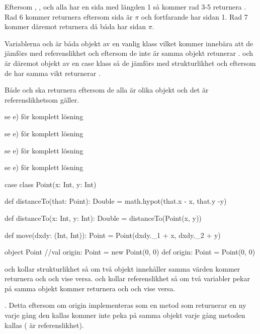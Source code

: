Eftersom , ,  och  alla har en sida med längden 1 så kommer rad 3-5 returnera . Rad 6 kommer returnera  eftersom  sida är $\pi$ och  fortfarande har sidan 1. Rad 7 kommer däremot returnera  då båda har sidan $\pi$.

\Task %

\Subtask Variablerna  och  är båda objekt av en vanlig klass vilket kommer innebära att de jämförs med referenslikhet och eftersom de inte är samma objekt retunerar \code{==} .  och  är däremot objekt av en case klass så de jämförs med strukturlikhet och eftersom de har samma vikt returnerar \code{==} .

\Subtask Både  och  ska returnera  eftersom de alla är olika objekt och det är referenslikhetsom gäller.

\Task %

\Subtask se e) för komplett lösning

\Subtask se e) för komplett lösning

\Subtask se e) för komplett lösning

\Subtask se e) för komplett lösning

\Subtask \begin{CodeSmall}
case class Point(x: Int, y: Int) {

	def distanceTo(that: Point): Double = math.hypot(that.x - x, that.y -y)

	def distanceTo(x: Int, y: Int): Double = distanceTo(Point(x, y))

	def move(dxdy: (Int, Int)): Point = Point(dxdy._1 + x, dxdy._2 + y)
}

object Point {
	//val origin: Point = new Point(0, 0)
	def origin: Point = Point(0, 0)
}
\end{CodeSmall}

\Subtask \code{==} och \code{!=} kollar strukturlikhet så om två objekt innehåller samma värden kommer \code{==} returnera  och \code{!=}  och vise versa.  och  kollar referenslikhet så om två variabler pekar på samma objekt kommer  returnera  och   och vise versa.

\Subtask {}. Detta eftersom om origin implementeras som en metod som returnerar en ny  varje gång den kallas kommer  inte peka på samma objekt varje gång metoden kallas ( är referenslikhet).

